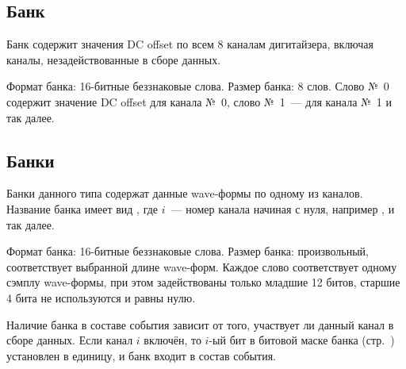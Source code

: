 \subsection{Банк }

Банк содержит значения DC offset \cite{CaenUM3051AIS} по всем 8 каналам дигитайзера, включая каналы, незадействованные в сборе данных.

Формат банка: 16-битные беззнаковые слова. Размер банка: 8 слов. Слово №~0 содержит значение DC offset для канала №~0, слово №~1~--- для канала №~1 и так далее.

\subsection{Банки }

Банки данного типа  содержат данные wave-формы по одному из каналов. Название банка имеет вид , где $i$~--- номер канала начиная с нуля, например ,  и так далее.

Формат банка: 16-битные беззнаковые слова. Размер банка: произвольный, соответствует выбранной длине wave-форм. Каждое слово соответствует одному сэмплу wave-формы, при этом задействованы только младшие 12 битов, старшие 4 бита не используются и равны нулю.

Наличие банка в составе события зависит от того, участвует ли данный канал в сборе данных. Если канал $i$ включён, то $i$-ый бит в битовой маске банка  (стр.~\pageref{sec_bank_info}) установлен в единицу, и банк  входит в состав события.













%

